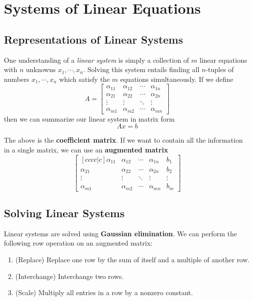 \chapter{Systems of Linear Equations}
\section{Representations of Linear Systems}
One understanding of a \textit{linear system} is simply a collection of $m$ linear equations with $n$ unknowns $x_{1}, \cdots, x_{n}$. Solving this system entails finding all $n$-tuples of numbers $x_{1}, \cdots, x_{n}$ which satisfy the $m$ equations simultaneously. If we define 
$$A = \begin{bmatrix}
\alpha_{11} & \alpha_{12} & \cdots & \alpha_{1n} \\
\alpha_{21} & \alpha_{22} & \cdots & \alpha_{2n} \\
\vdots & \vdots & \ddots & \vdots \\
\alpha_{m1} & \alpha_{m2} & \cdots & \alpha_{mn}
\end{bmatrix}$$
then we can summarize our linear system in matrix form
$$Ax = b$$

The above is the \textbf{coefficient matrix}. If we want to contain all the information in a single matrix, we can use an \textbf{augmented matrix}
$$\begin{bmatrix}[cccc|c]
\alpha_{11} & \alpha_{12} & \cdots & \alpha_{1n} & b_{1}\\
\alpha_{21} & \alpha_{22} & \cdots & \alpha_{2n} & b_{2}\\
\vdots & \vdots & \ddots & \vdots & \vdots\\
\alpha_{m1} & \alpha_{m2} & \cdots & \alpha_{mn} & b_{m}
\end{bmatrix}$$

\section{Solving Linear Systems}
Linear systems are solved using \textbf{Gaussian elimination}. We can perform the following row operation on an augmented matrix:
\begin{enumerate}
	\item (Replace) Replace one row by the sum of itself and a multiple of another row. 
	\item (Interchange) Interchange two rows. 
	\item (Scale) Multiply all entries in a row by a nonzero constant. 
\end{enumerate}

